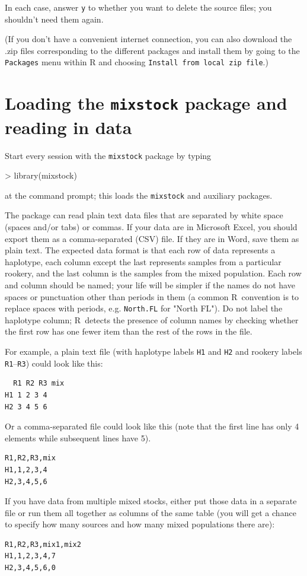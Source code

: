 \documentclass[11pt]{article}
\newcommand{\R}{{\sf R}}
\newcommand{\code}[1]{{\tt #1}}
\begin{document}
In each case, answer {\tt y} to whether you want to delete
the source files; you shouldn't need them again.

(If you don't have a convenient internet connection,
you can also download the .zip files corresponding
to the different packages and install them by going
to the \code{Packages} menu within R and choosing
{\tt Install from local zip file}.)

\section{Loading the {\tt mixstock} package and reading  in data}
Start every session with the {\tt mixstock} package by
typing 
\begin{Schunk}
\begin{Sinput}
> library(mixstock)
\end{Sinput}
\end{Schunk}
at the command prompt;
this loads the {\tt mixstock} and auxiliary packages.

The package can read plain text data files that are separated by white
space (spaces and/or tabs) or commas.  If your data are in Microsoft
Excel, you should export them as a comma-separated (CSV) file.  If
they are in Word, save them as plain text.  The expected data format
is that each row of data represents a haplotype, each column except
the last represents samples from a particular rookery, and the last
column is the samples from the mixed population.  Each row and column
should be named; your life will be simpler if the names do not have
spaces or punctuation other than periods in them (a common \R\ convention
is to replace spaces with periods, e.g. {\tt North.FL} for
"North FL").  Do not label the haplotype column; \R\ detects the
presence of column names by checking whether the first row has one
fewer item than the rest of the rows in the file.

For example, a plain text file (with
haplotype labels {\tt H1} and {\tt H2}
and rookery labels {\tt R1}--{\tt R3})
could look like this:
\begin{verbatim}
  R1 R2 R3 mix
H1 1 2 3 4
H2 3 4 5 6
\end{verbatim}
Or a comma-separated file could look like this
(note that the first line has only 4 elements while
subsequent lines have 5).
\begin{verbatim}
R1,R2,R3,mix
H1,1,2,3,4
H2,3,4,5,6
\end{verbatim}

If you have data from multiple mixed stocks, either
put those data in a separate file or run them all
together as columns of the same table (you will
get a chance to specify how many sources and how
many mixed populations there are):
\begin{verbatim}
R1,R2,R3,mix1,mix2
H1,1,2,3,4,7
H2,3,4,5,6,0
\end{verbatim}
\end{document}
